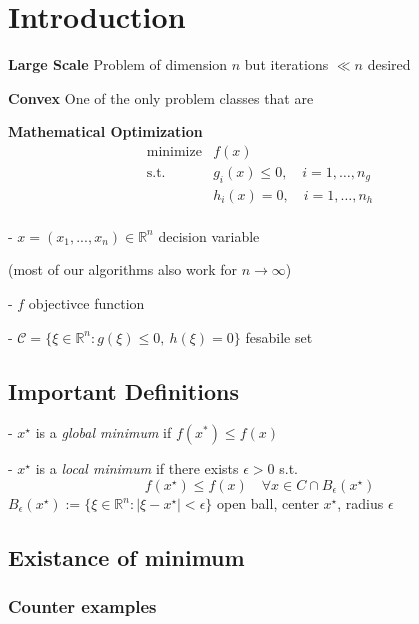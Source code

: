 \section{Introduction}

\textbf{Large Scale}
Problem of dimension $n$ but iterations $\ll n$ desired

\textbf{Convex}
One of the only problem classes that are 

\textbf{Mathematical Optimization}
\begin{equation}
	\begin{aligned}
		\operatorname{minimize} & f(x)                               \\
		\text{s.t.}             & g_i(x) \le 0,\quad i = 1,\dots,n_g \\
		                        & h_i(x) = 0,\quad i = 1,\dots,n_h   \\
	\end{aligned}
	\label{eq:optimization}
\end{equation}

- $x = (x_1,...,x_n) \in \mathbb{R}^{n}$ decision variable

\quad (most of our algorithms also work for $n\rightarrow\infty$)

- $f$ objectivce function

- $\mathcal{C} = \{\xi \in \mathbb{R}^{n}: g(\xi)\le0,\ h(\xi)=0\}$ fesabile set

\subsection{Important Definitions}

- $x^\star$ is a \textit{global minimum} if $f(x^*)\leq f(x)$

- $x^\star$ is a \textit{local minimum} if there exists $\epsilon > 0$ s.t.
$$f(x^\star)\leq f(x) \quad \forall x \in C \cap B_\epsilon(x^\star)$$
$B_\epsilon(x^\star):=\{\xi\in\mathbb{R}^{n}:|\xi-x^\star|<\epsilon\}$ open ball, center $x^\star$, radius $\epsilon$

\subsection{Existance of minimum}

\subsubsection{Counter examples}

